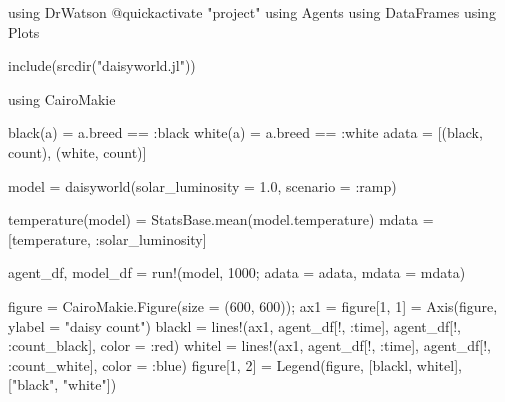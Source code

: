 \documentclass[
  english,
  russian,
  12pt,
  a4paper,
  DIV=11,
  numbers=noendperiod]{scrreprt}
\newenvironment{Shaded}{\begin{snugshade}}{\end{snugshade}}
\newcommand{\BuiltInTok}[1]{\textcolor[rgb]{0.00,0.23,0.31}{#1}}
\newcommand{\FloatTok}[1]{\textcolor[rgb]{0.68,0.00,0.00}{#1}}
\newcommand{\FunctionTok}[1]{\textcolor[rgb]{0.28,0.35,0.67}{#1}}
\newcommand{\ImportTok}[1]{\textcolor[rgb]{0.00,0.46,0.62}{#1}}
\newcommand{\NormalTok}[1]{\textcolor[rgb]{0.00,0.23,0.31}{#1}}
\newcommand{\OperatorTok}[1]{\textcolor[rgb]{0.37,0.37,0.37}{#1}}
\newcommand{\PreprocessorTok}[1]{\textcolor[rgb]{0.68,0.00,0.00}{#1}}
\newcommand{\StringTok}[1]{\textcolor[rgb]{0.13,0.47,0.30}{#1}}
\begin{document}
\begin{Shaded}
\begin{Highlighting}[]
\ImportTok{using} \BuiltInTok{DrWatson}
\PreprocessorTok{@quickactivate} \StringTok{"project"}
\ImportTok{using} \BuiltInTok{Agents}
\ImportTok{using} \BuiltInTok{DataFrames}
\ImportTok{using} \BuiltInTok{Plots}


\FunctionTok{include}\NormalTok{(}\FunctionTok{srcdir}\NormalTok{(}\StringTok{"daisyworld.jl"}\NormalTok{))}

\ImportTok{using} \BuiltInTok{CairoMakie}

\FunctionTok{black}\NormalTok{(a) }\OperatorTok{=}\NormalTok{ a.breed }\OperatorTok{==} \OperatorTok{:}\NormalTok{black}
\FunctionTok{white}\NormalTok{(a) }\OperatorTok{=}\NormalTok{ a.breed }\OperatorTok{==} \OperatorTok{:}\NormalTok{white}
\NormalTok{adata }\OperatorTok{=}\NormalTok{ [(black, count), (white, count)]}

\NormalTok{model }\OperatorTok{=} \FunctionTok{daisyworld}\NormalTok{(solar\_luminosity }\OperatorTok{=} \FloatTok{1.0}\NormalTok{, scenario }\OperatorTok{=} \OperatorTok{:}\NormalTok{ramp)}

\FunctionTok{temperature}\NormalTok{(model) }\OperatorTok{=}\NormalTok{ StatsBase.}\FunctionTok{mean}\NormalTok{(model.temperature)}
\NormalTok{mdata }\OperatorTok{=}\NormalTok{ [temperature, }\OperatorTok{:}\NormalTok{solar\_luminosity]}

\NormalTok{agent\_df, model\_df }\OperatorTok{=} \FunctionTok{run!}\NormalTok{(model, }\FloatTok{1000}\NormalTok{; adata }\OperatorTok{=}\NormalTok{ adata, mdata }\OperatorTok{=}\NormalTok{ mdata)}

\NormalTok{figure }\OperatorTok{=}\NormalTok{ CairoMakie.}\FunctionTok{Figure}\NormalTok{(size }\OperatorTok{=}\NormalTok{ (}\FloatTok{600}\NormalTok{, }\FloatTok{600}\NormalTok{));}
\NormalTok{ax1 }\OperatorTok{=}\NormalTok{ figure[}\FloatTok{1}\NormalTok{, }\FloatTok{1}\NormalTok{] }\OperatorTok{=} \FunctionTok{Axis}\NormalTok{(figure, ylabel }\OperatorTok{=} \StringTok{"daisy count"}\NormalTok{)}
\NormalTok{blackl }\OperatorTok{=} \FunctionTok{lines!}\NormalTok{(ax1, agent\_df[!, }\OperatorTok{:}\NormalTok{time], agent\_df[!, }\OperatorTok{:}\NormalTok{count\_black], color }\OperatorTok{=} \OperatorTok{:}\NormalTok{red)}
\NormalTok{whitel }\OperatorTok{=} \FunctionTok{lines!}\NormalTok{(ax1, agent\_df[!, }\OperatorTok{:}\NormalTok{time], agent\_df[!, }\OperatorTok{:}\NormalTok{count\_white], color }\OperatorTok{=} \OperatorTok{:}\NormalTok{blue)}
\NormalTok{figure[}\FloatTok{1}\NormalTok{, }\FloatTok{2}\NormalTok{] }\OperatorTok{=} \FunctionTok{Legend}\NormalTok{(figure, [blackl, whitel], [}\StringTok{"black"}\NormalTok{, }\StringTok{"white"}\NormalTok{])}


\end{Highlighting}
\end{Shaded}
\end{document}
